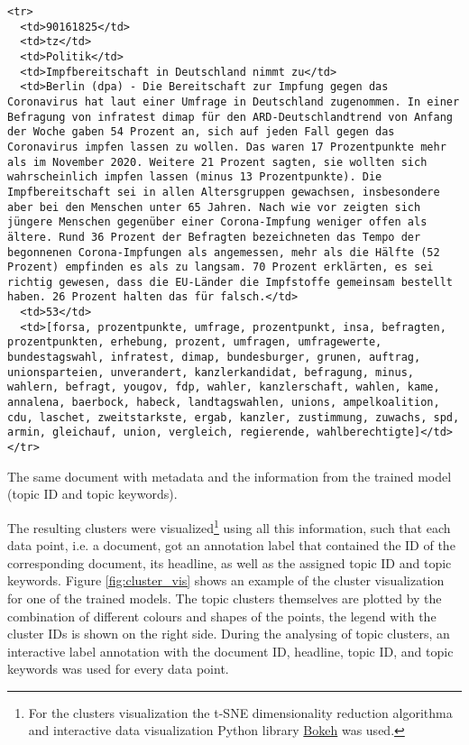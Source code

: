 \documentclass[fontsize=12pt,a4paper,twoside,openany]{scrbook}
\begin{document}
\begin{listing}[ht]
\begin{verbatim}
<tr>
  <td>90161825</td>
  <td>tz</td>
  <td>Politik</td>
  <td>Impfbereitschaft in Deutschland nimmt zu</td>
  <td>Berlin (dpa) - Die Bereitschaft zur Impfung gegen das Coronavirus hat laut einer Umfrage in Deutschland zugenommen. In einer Befragung von infratest dimap für den ARD-Deutschlandtrend von Anfang der Woche gaben 54 Prozent an, sich auf jeden Fall gegen das Coronavirus impfen lassen zu wollen. Das waren 17 Prozentpunkte mehr als im November 2020. Weitere 21 Prozent sagten, sie wollten sich wahrscheinlich impfen lassen (minus 13 Prozentpunkte). Die Impfbereitschaft sei in allen Altersgruppen gewachsen, insbesondere aber bei den Menschen unter 65 Jahren. Nach wie vor zeigten sich jüngere Menschen gegenüber einer Corona-Impfung weniger offen als ältere. Rund 36 Prozent der Befragten bezeichneten das Tempo der begonnenen Corona-Impfungen als angemessen, mehr als die Hälfte (52 Prozent) empfinden es als zu langsam. 70 Prozent erklärten, es sei richtig gewesen, dass die EU-Länder die Impfstoffe gemeinsam bestellt haben. 26 Prozent halten das für falsch.</td>
  <td>53</td>
  <td>[forsa, prozentpunkte, umfrage, prozentpunkt, insa, befragten, prozentpunkten, erhebung, prozent, umfragen, umfragewerte, bundestagswahl, infratest, dimap, bundesburger, grunen, auftrag, unionsparteien, unverandert, kanzlerkandidat, befragung, minus, wahlern, befragt, yougov, fdp, wahler, kanzlerschaft, wahlen, kame, annalena, baerbock, habeck, landtagswahlen, unions, ampelkoalition, cdu, laschet, zweitstarkste, ergab, kanzler, zustimmung, zuwachs, spd, armin, gleichauf, union, vergleich, regierende, wahlberechtigte]</td>
</tr>
\end{verbatim}
\caption{The same document with metadata and the information from the trained model (topic ID and topic keywords).} 
\label{listing:data-example}
\end{listing}

The resulting clusters were visualized\footnote{For the clusters visualization the t-SNE dimensionality reduction algorithma and interactive data visualization Python library \href{https://bokeh.org/}{Bokeh} was used.} using all this information, such that each data point, i.e. a document, got an annotation label that contained the ID of the corresponding document, its headline, as well as the assigned topic ID and topic keywords. Figure \ref{fig:cluster_vis} shows an example of the cluster visualization for one of the trained models. The topic clusters themselves are plotted by the combination of different colours and shapes of the points, the legend with the cluster IDs is shown on the right side. During the analysing of topic clusters, an interactive label annotation with the document ID, headline, topic ID, and topic keywords was used for every data point.
\end{document}
